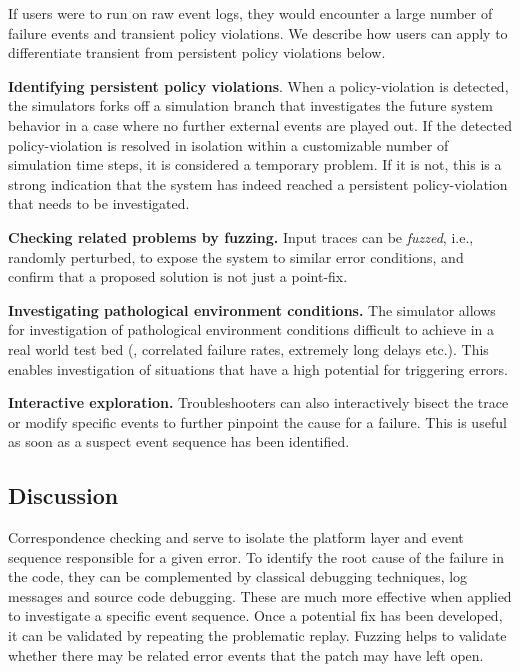 
If users were to run \simulator{} on raw event logs, they would encounter a
large number of failure events and transient policy violations. We describe
how users can apply \simulator{} to differentiate transient from persistent
policy violations below.

\textbf{Identifying persistent policy violations}. When a policy-violation is detected,
the simulators forks off a simulation branch that investigates the future system behavior
in a case where no further external events are played out. If the detected
policy-violation
is resolved in isolation within a customizable number of simulation time steps, it is considered
a temporary problem. If it is not, this is a strong indication that the system has indeed
reached a persistent policy-violation that needs to be investigated.

\textbf{Checking related problems by fuzzing.} Input traces can be \emph{fuzzed}, i.e.,
randomly perturbed, to expose the system to similar error conditions, and confirm
that a proposed solution is not just a point-fix. 

\textbf{Investigating pathological environment conditions.} The simulator allows for investigation
of pathological environment conditions difficult to achieve in a real world test bed
(\eg{}, correlated failure rates, extremely long delays etc.). This enables
investigation of situations that have a high potential for triggering errors.

\textbf{Interactive exploration.} Troubleshooters can also interactively bisect
the trace or modify specific events to further pinpoint the cause for a failure.
This is useful as soon as a suspect event sequence has been identified.

\subsection{Discussion}
Correspondence checking and \simulator{} serve to isolate the platform layer and
event sequence responsible for a given error. To identify the root cause of
the failure in the code, they can be complemented by classical debugging
techniques,\ie{} log messages and source code debugging. These are much more
effective when applied to investigate a specific event sequence. Once a
potential fix has been developed, it can be validated by repeating the
problematic replay. Fuzzing helps to validate whether there may be
related error events that the patch may have left open.


